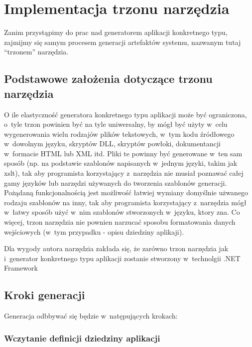 \chapter{Implementacja trzonu narzędzia} \label{chap:implementation:core}

Zanim przystąpimy do prac nad generatorem aplikacji konkretnego typu, zajmijmy się samym procesem generacji artefaktów systemu, nazwanym tutaj ``trzonem'' narzędzia.



\section{Podstawowe założenia dotyczące trzonu narzędzia} \label{sec:core:basic_requirements}

O ile elastyczność generatora konkretnego typu aplikacji może być ograniczona, o~tyle trzon powinien być na tyle uniwersalny, by mógł być użyty w~celu wygenerowania wielu rodzajów plików tekstowych, w~tym kodu źródłowego w~dowolnym języku, skryptów DLL, skryptów powłoki, dokumentancji w~formacie HTML lub XML itd.
Pliki te powinny być generowane w~ten sam sposób (np. na podstawie szablonów napisanych w~jednym języki, takim jak xslt), tak aby programista korzystający z~narzędzia nie musiał poznawać całej gamy języków lub narzędzi używanych do tworzenia szablonów generacji.
Pożądaną funkcjonalnością jest możliwość łatwiej wymiany domyślnie użwanego rodzaju szablonów na inny, tak aby programista korzystający z~narzędzia mógł w~łatwy sposób użyć w~nim szablonów stworzonych w~języku, ktory zna.
Co więcej, trzon narzędzia nie pownien narzucać sposobu formatowania danych wejściowych (w~tym przypadku - opisu dziedziny aplikaji).

Dla wygody autora narzędzia zakłada się, że zarówno trzon narzędzia jak i~generator konkretnego typu aplikacji zostanie stworzony w~technolgii .NET Framework



\section{Kroki generacji}

Generacja odbbywać się będzie w~natępujących krokach:


\subsection{Wczytanie definicji dziedziny aplikacji}


